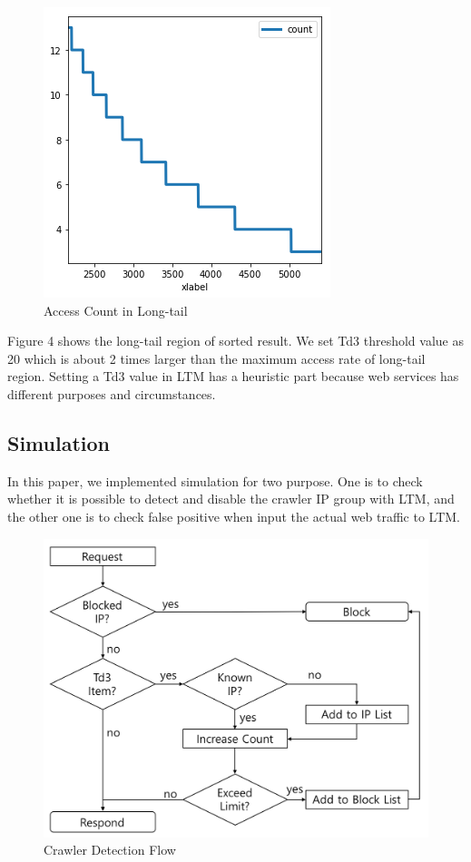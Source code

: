 \documentclass[sigconf,anonymous=true]{acmart}
\begin{document}
\begin{figure}[H]
    \centering
    \includegraphics[width=0.85\columnwidth]{figs/figure_04_td3.png}
    \caption{Access Count in Long-tail}
    \label{fig:fig5}
\end{figure}

Figure 4 shows the long-tail region of sorted result. We set Td3 threshold value as 20 which is about 2 times larger than the maximum access rate of long-tail region. Setting a Td3 value in LTM has a heuristic part because web services has different purposes and circumstances.

\subsection{Simulation}
In this paper, we implemented simulation for two purpose. One is to check whether it is possible to detect and disable the crawler IP group with LTM, and the other one is to check false positive when input the actual web traffic to LTM.

\begin{figure} [H]
    \includegraphics[width=0.88\columnwidth]{figs/flow_chart_01.png}
    \caption{Crawler Detection Flow}
    \label{fig:fig6}
\end{figure}
\end{document}
